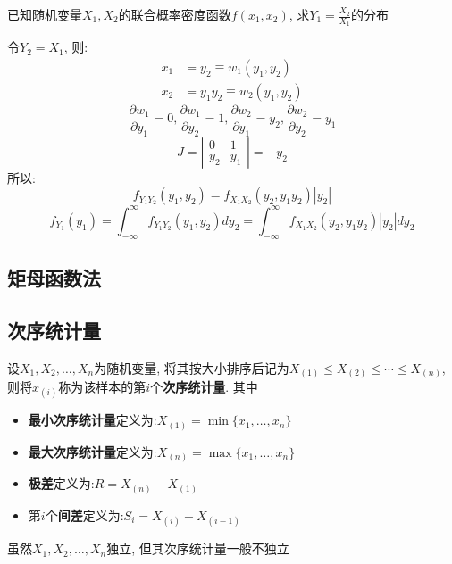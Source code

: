 \begin{example}
    已知随机变量$X_1,X_2$的联合概率密度函数$f(x_1,x_2)$, 求$Y_1=\frac{X_2}{X_1}$的分布

    令$Y_{2}=X_{1}$, 则:
    \begin{align*}
        x_{1} & =y_{2}\equiv w_{1}(y_{1}, y_{2})       \\
        x_{2} & =y_{1} y_{2}\equiv w_{2}(y_{1}, y_{2})
    \end{align*}
    \[ \frac{\partial w_{1}}{\partial y_{1}}=0, \frac{\partial w_{1}}{\partial y_{2}}=1, \frac{\partial w_{2}}{\partial y_{1}}=y_{2}, \frac{\partial w_{2}}{\partial y_{2}}=y_{1}\]
    \[ J=\left|\begin{array}{cc}0 & 1 \\ y_{2} & y_{1}\end{array}\right|=-y_{2}\]
    所以:
    \[ f_{Y_1 Y_2}(y_1, y_2)=f_{X_1 X_2}(y_{2}, y_{1} y_{2})\left|y_2\right| \]
    \[ f_{Y_1}(y_1)=\int_{-\infty}^{\infty} f_{Y_{1} Y_{2}}\left(y_{1}, y_{2}\right) d y_{2}=\int_{-\infty}^{\infty} f_{X_{1} X_{2}}\left(y_{2}, y_{1} y_{2}\right)\left|y_{2}\right| d y_{2} \]
\end{example}

\subsection{矩母函数法}

\subsection{次序统计量}

\begin{definition}
    设$X_1,X_2,\dotsc,X_n$为随机变量, 将其按大小排序后记为$X_{(1)}\le X_{(2)} \le  \cdots \le X_{(n)}$, 则将$x_{(i)}$称为该样本的第$i$个\textbf{次序统计量}. 其中
    \begin{itemize}
        \item \textbf{最小次序统计量}定义为:$X_{(1)}=\min\{x_1,\dotsc,x_n\}$
        \item \textbf{最大次序统计量}定义为:$X_{(n)}=\max\{x_1,\dotsc,x_n\}$
        \item \textbf{极差}定义为:$R=X_{(n)}-X_{(1)}$
        \item 第$i$个\textbf{间差}定义为:$S_i=X_{(i)}-X_{(i-1)}$
    \end{itemize}
\end{definition}

\begin{remark}
    虽然$X_1,X_2,\dotsc,X_n$独立, 但其次序统计量一般不独立
\end{remark}

